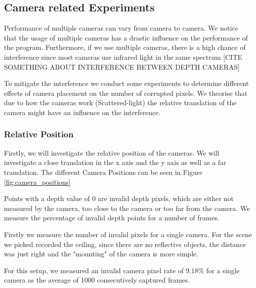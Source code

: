 \subsection{Camera related Experiments}

Performance of multiple cameras can vary from camera to camera. We notice that the usage of multiple cameras has a drastic influence on the performance of the program. Furthermore, if we use multiple cameras, there is a high chance of interference since most cameras use infrared light in the same spectrum [CITE SOMETHING ABOUT INTERFERENCE BETWEEN DEPTH CAMERAS]

To mitigate the interference we conduct some experiments to determine different effects of camera placement on the number of corrupted pixels. We theorise that due to how the cameras work (Scattered-light) the relative translation of the camera might have an influence on the interference.

\subsubsection{Relative Position}

Firstly, we will investigate the relative position of the cameras. We will investigate a close translation in the x axis and the y axis as well as a far translation. The different Camera Positions can be seen in Figure \ref{fig:camera_positions}



Points with a depth value of 0 are invalid depth pixels, which are either not measured by the camera, too close to the camera or too far from the camera. We measure the percentage of invalid depth points for a number of frames.

Firstly we measure the number of invalid pixels for a single camera. For the scene we picked recorded the ceiling, since there are no reflective objects, the distance was just right and the "mounting" of the camera is more simple.

For this setup, we measured an invalid camera pixel rate of $9.18\%$ for a single camera as the average of 1000 consecutively captured frames.

